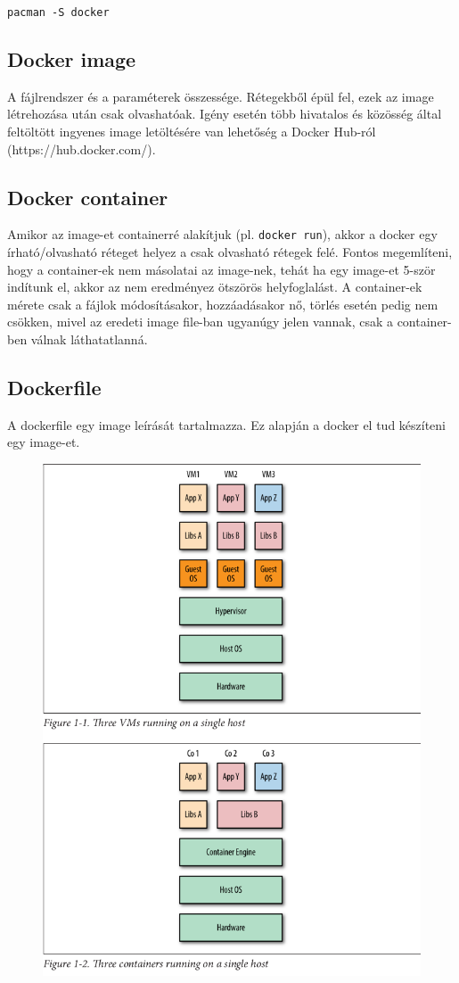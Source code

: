\documentclass[]{article}
\numberwithin{equation}{section}
\begin{document}
\texttt{pacman -S docker}
\subsection{Docker image}

A fájlrendszer és a paraméterek összessége. Rétegekből épül fel, ezek az image létrehozása után csak olvashatóak. Igény esetén több hivatalos és közösség által feltöltött ingyenes image letöltésére van lehetőség a Docker Hub-ról (https://hub.docker.com/).


\subsection{Docker container}
Amikor az image-et containerré alakítjuk (pl. \texttt{docker run}), akkor a docker egy írható/olvasható réteget helyez a csak olvasható rétegek felé. Fontos megemlíteni, hogy a container-ek nem másolatai az image-nek, tehát ha egy image-et 5-ször indítunk el, akkor az nem eredményez ötszörös helyfoglalást. A container-ek mérete csak a fájlok módosításakor, hozzáadásakor nő, törlés esetén pedig nem csökken, mivel az eredeti image file-ban ugyanúgy jelen vannak, csak a container-ben válnak láthatatlanná.

\subsection{Dockerfile}

A dockerfile egy image leírását tartalmazza. Ez alapján a docker el tud készíteni egy image-et.

\begin{figure}
	\centering
	\includegraphics[width=0.9\linewidth]{cont_vs_vm}
	\caption{}
	\label{fig:contvsvm}
\end{figure}
\end{document}
